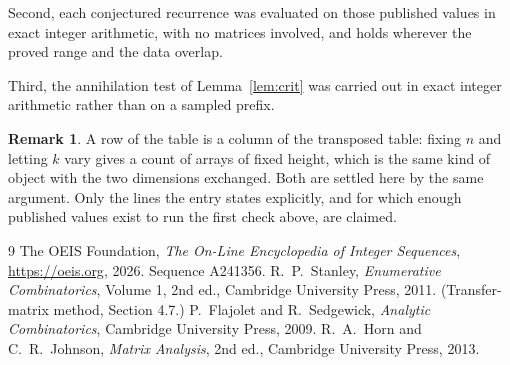 \documentclass[11pt,a4paper]{article}
\theoremstyle{plain}
\theoremstyle{definition}
\newtheorem{remark}[theorem]{Remark}
\begin{document}
Second, each conjectured recurrence was evaluated on those published values in exact
integer arithmetic, with no matrices involved, and holds wherever the proved range and the
data overlap.

Third, the annihilation test of Lemma~\ref{lem:crit} was carried out in exact integer
arithmetic rather than on a sampled prefix.

\begin{remark}
A row of the table is a column of the transposed table: fixing $n$ and letting $k$ vary gives a
count of arrays of fixed height, which is the same kind of object with the two dimensions
exchanged. Both are settled here by the same argument. Only the lines the entry states
explicitly, and for which enough published values exist to run the first check above, are
claimed.
\end{remark}

\begin{thebibliography}{9}
 The OEIS Foundation, \emph{The On-Line Encyclopedia of Integer
Sequences}, \url{https://oeis.org}, 2026. Sequence A241356.
 R.~P.~Stanley, \emph{Enumerative Combinatorics}, Volume 1, 2nd ed.,
Cambridge University Press, 2011. (Transfer-matrix method, Section 4.7.)
 P.~Flajolet and R.~Sedgewick, \emph{Analytic Combinatorics}, Cambridge
University Press, 2009.
 R.~A.~Horn and C.~R.~Johnson, \emph{Matrix Analysis}, 2nd ed., Cambridge
University Press, 2013.
\end{thebibliography}
\end{document}

